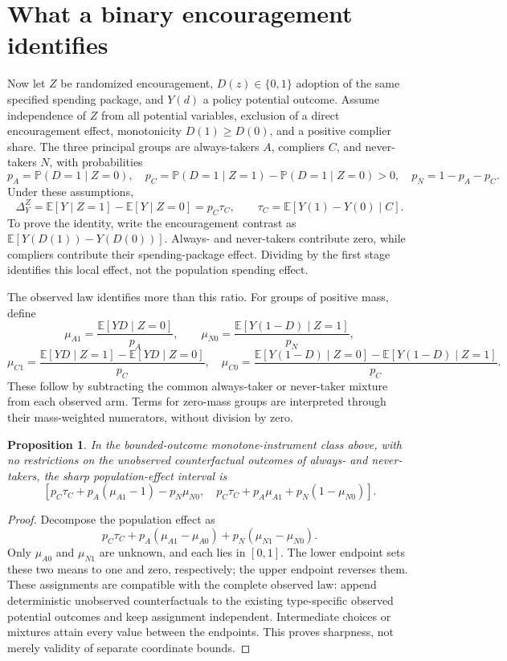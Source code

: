 \documentclass[11pt]{article}
\newtheorem{proposition}{Proposition}
\newcommand{\E}{\mathbb E}
\newcommand{\Prb}{\mathbb P}
\begin{document}
\section*{What a binary encouragement identifies}
Now let $Z$ be randomized encouragement, $D(z)\in\{0,1\}$ adoption of the same specified spending package, and $Y(d)$ a policy potential outcome. Assume independence of $Z$ from all potential variables, exclusion of a direct encouragement effect, monotonicity $D(1)\geq D(0)$, and a positive complier share. The three principal groups are always-takers $A$, compliers $C$, and never-takers $N$, with probabilities
\[
 p_A=\Prb(D=1\mid Z=0),\quad
 p_C=\Prb(D=1\mid Z=1)-\Prb(D=1\mid Z=0)>0,
 \quad p_N=1-p_A-p_C.
\]
Under these assumptions,
\[
 \Delta_Y^Z=\E[Y\mid Z=1]-\E[Y\mid Z=0]
           =p_C\tau_C,
 \qquad \tau_C=\E[Y(1)-Y(0)\mid C].
\]
To prove the identity, write the encouragement contrast as
$\E[Y(D(1))-Y(D(0))]$. Always- and never-takers contribute zero, while compliers contribute their spending-package effect. Dividing by the first stage identifies this local effect, not the population spending effect.

The observed law identifies more than this ratio. For groups of positive mass, define
\[
 \mu_{A1}=\frac{\E[YD\mid Z=0]}{p_A},\qquad
 \mu_{N0}=\frac{\E[Y(1-D)\mid Z=1]}{p_N},
\]
\[
 \mu_{C1}=\frac{\E[YD\mid Z=1]-\E[YD\mid Z=0]}{p_C},\quad
 \mu_{C0}=\frac{\E[Y(1-D)\mid Z=0]-\E[Y(1-D)\mid Z=1]}{p_C}.
\]
These follow by subtracting the common always-taker or never-taker mixture from each observed arm. Terms for zero-mass groups are interpreted through their mass-weighted numerators, without division by zero.

\begin{proposition}
In the bounded-outcome monotone-instrument class above, with no restrictions on the unobserved counterfactual outcomes of always- and never-takers, the sharp population-effect interval is
\[
 \left[p_C\tau_C+p_A(\mu_{A1}-1)-p_N\mu_{N0},\quad
 p_C\tau_C+p_A\mu_{A1}+p_N(1-\mu_{N0})\right].
\]
\end{proposition}
\begin{proof}
Decompose the population effect as
\[
 p_C\tau_C+p_A(\mu_{A1}-\mu_{A0})
             +p_N(\mu_{N1}-\mu_{N0}).
\]
Only $\mu_{A0}$ and $\mu_{N1}$ are unknown, and each lies in $[0,1]$. The lower endpoint sets these two means to one and zero, respectively; the upper endpoint reverses them. These assignments are compatible with the complete observed law: append deterministic unobserved counterfactuals to the existing type-specific observed potential outcomes and keep assignment independent. Intermediate choices or mixtures attain every value between the endpoints. This proves sharpness, not merely validity of separate coordinate bounds.
\end{proof}
\end{document}
